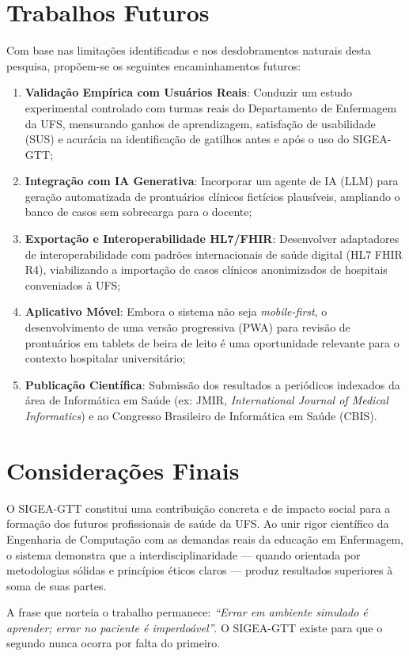 \section{Trabalhos Futuros}
\label{sec_trabalhos_futuros}

Com base nas limitações identificadas e nos desdobramentos naturais
desta pesquisa, propõem-se os seguintes encaminhamentos futuros:

\begin{enumerate}
    \item \textbf{Validação Empírica com Usuários Reais}: Conduzir um
    estudo experimental controlado com turmas reais do Departamento de
    Enfermagem da UFS, mensurando ganhos de aprendizagem, satisfação de
    usabilidade (SUS) e acurácia na identificação de gatilhos antes e
    após o uso do SIGEA-GTT;
    \item \textbf{Integração com IA Generativa}: Incorporar um agente de
    IA (LLM) para geração automatizada de prontuários clínicos fictícios
    plausíveis, ampliando o banco de casos sem sobrecarga para o docente;
    \item \textbf{Exportação e Interoperabilidade HL7/FHIR}: Desenvolver
    adaptadores de interoperabilidade com padrões internacionais de saúde
    digital (HL7 FHIR R4), viabilizando a importação de casos clínicos
    anonimizados de hospitais conveniados à UFS;
    \item \textbf{Aplicativo Móvel}: Embora o sistema não seja
    \textit{mobile-first}, o desenvolvimento de uma versão progressiva
    (PWA) para revisão de prontuários em tablets de beira de leito é uma
    oportunidade relevante para o contexto hospitalar universitário;
    \item \textbf{Publicação Científica}: Submissão dos resultados a
    periódicos indexados da área de Informática em Saúde (ex: JMIR,
    \textit{International Journal of Medical Informatics}) e ao Congresso
    Brasileiro de Informática em Saúde (CBIS).
\end{enumerate}

\section{Considerações Finais}
\label{sec_consideracoes_finais}

O SIGEA-GTT constitui uma contribuição concreta e de impacto social para
a formação dos futuros profissionais de saúde da UFS. Ao unir rigor
científico da Engenharia de Computação com as demandas reais da educação
em Enfermagem, o sistema demonstra que a interdisciplinaridade — quando
orientada por metodologias sólidas e princípios éticos claros — produz
resultados superiores à soma de suas partes.

A frase que norteia o trabalho permanece: \textit{``Errar em ambiente
simulado é aprender; errar no paciente é imperdoável''}. O SIGEA-GTT
existe para que o segundo nunca ocorra por falta do primeiro.
